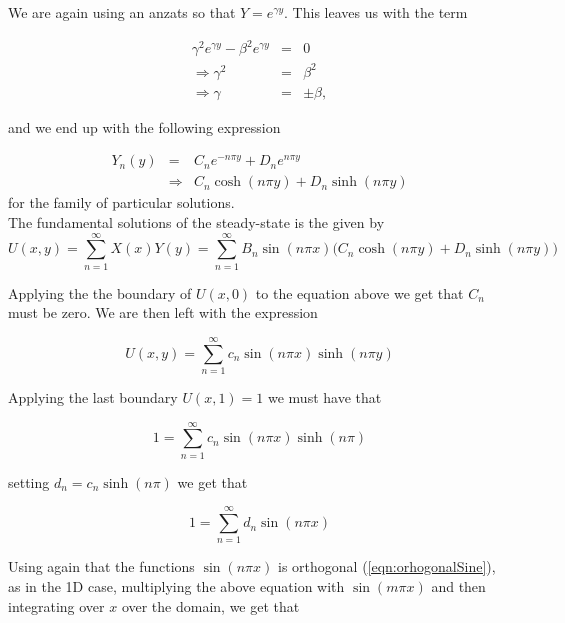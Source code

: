 \documentclass{article}
\begin{document}
We are again using an anzats so that $Y = e^{\gamma y}$. This leaves us with the term

\begin{subequations}
	\begin{eqnarray}
	\gamma^2 e^{\gamma y} - \beta^2 e^{\gamma y} &=& 0 \\ 
	\Rightarrow \gamma^2 &=& \beta^2 \\ 
	\Rightarrow \gamma &=& \pm \beta,
	\end{eqnarray}
\end{subequations}

and we end up with the following expression

\begin{eqnarray}
Y_n(y) &=& C_ne^{-n\pi y} + D_ne^{n\pi y} \\ 
&\Rightarrow & C_n\cosh(n\pi y) + D_n\sinh(n\pi y)
\end{eqnarray}
for the family of particular solutions.
\\

The fundamental solutions of the steady-state is the given by
\begin{equation}
U(x,y) = \sum_{n=1}^{\infty} X(x)Y(y) = \sum_{n=1}^{\infty} B_n\sin(n\pi x)\Big(C_n\cosh(n\pi y) + D_n\sinh(n\pi y)\Big)
\end{equation}

Applying the the boundary of $U(x,0)$ to the equation above we get that $C_n$ must be zero. We are then left with the expression

\begin{equation}
U(x,y) = \sum_{n=1}^{\infty} c_n \sin(n\pi x)\sinh(n\pi y)
\label{eqn:UsteadyStatefundamentalSolutions}
\end{equation}

Applying the last boundary $U(x,1) = 1$ we must have that

\begin{equation}
1 = \sum_{n=1}^{\infty} c_n \sin(n\pi x)\sinh(n\pi)
\end{equation}

setting $d_n = c_n\sinh(n\pi)$ we get that 

\begin{equation}
1 = \sum_{n=1}^{\infty} d_n \sin(n\pi x)
\end{equation}

Using again that the functions $\sin(n\pi x)$ is orthogonal (\ref{eqn:orhogonalSine}), as in the 1D case, multiplying the above equation with $ \sin(m\pi x)$ and  then integrating over $x$ over the domain, we get that 
\end{document}
